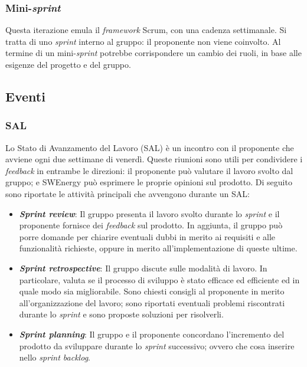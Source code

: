 \subsubsection{Mini-\textit{sprint}}
Questa iterazione emula il \textit{framework} Scrum, con una cadenza
settimanale. Si tratta di uno \textit{sprint}
interno al gruppo: il proponente non viene coinvolto. Al termine di un
mini-\textit{sprint} potrebbe corrispondere un cambio dei ruoli, in base alle
esigenze del progetto e del gruppo.

\subsection{Eventi}

\subsubsection{SAL}
Lo Stato di Avanzamento del Lavoro (SAL) è un incontro con il proponente che
avviene ogni due settimane di venerdì. Queste riunioni sono utili per
condividere i \textit{feedback} in entrambe le direzioni: il proponente può
valutare il lavoro svolto dal gruppo; e SWEnergy può esprimere le proprie
opinioni sul prodotto. Di seguito sono riportate le attività principali che
avvengono durante un SAL:

\begin{itemize}
	\item \textbf{\textit{Sprint review}}: Il gruppo presenta il lavoro svolto
	      durante lo
	      \textit{sprint} e il proponente fornisce dei \textit{feedback} sul
	      prodotto. In aggiunta, il gruppo può porre domande per chiarire
	      eventuali dubbi in merito ai requisiti e alle funzionalità richieste,
	      oppure in merito all'implementazione di queste ultime.

	\item \textbf{\textit{Sprint retrospective}}: Il gruppo discute sulle modalità
	      di lavoro. In particolare, valuta se il processo di sviluppo
	      è stato efficace ed efficiente ed in quale modo sia migliorabile.
	      Sono chiesti consigli al proponente in merito all'organizzazione del
	      lavoro; sono riportati eventuali problemi riscontrati durante lo
	      \textit{sprint} e sono proposte soluzioni per risolverli.

	\item \textbf{\textit{Sprint planning}}: Il gruppo e il proponente concordano
	      l'incremento del prodotto da sviluppare durante lo \textit{sprint}
	      successivo; ovvero che cosa inserire nello \textit{sprint backlog}.
\end{itemize}

